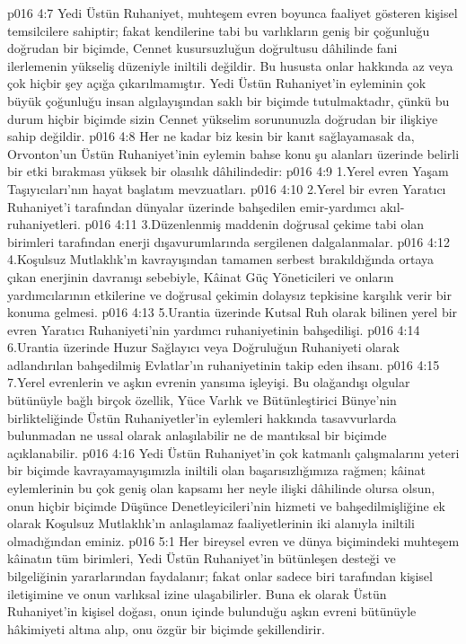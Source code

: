 \vs p016 4:7 Yedi Üstün Ruhaniyet, muhteşem evren boyunca faaliyet gösteren kişisel temsilcilere sahiptir; fakat kendilerine tabi bu varlıkların geniş bir çoğunluğu doğrudan bir biçimde, Cennet kusursuzluğun doğrultusu dâhilinde fani ilerlemenin yükseliş düzeniyle iniltili değildir. Bu hususta onlar hakkında az veya çok hiçbir şey açığa çıkarılmamıştır. Yedi Üstün Ruhaniyet’in eyleminin çok büyük çoğunluğu insan algılayışından saklı bir biçimde tutulmaktadır, çünkü bu durum hiçbir biçimde sizin Cennet yükselim sorununuzla doğrudan bir ilişkiye sahip değildir.
\vs p016 4:8 Her ne kadar biz kesin bir kanıt sağlayamasak da, Orvonton’un Üstün Ruhaniyet’inin eylemin bahse konu şu alanları üzerinde belirli bir etki bırakması yüksek bir olasılık dâhilindedir:
\vs p016 4:9 1.\bibnobreakspace Yerel evren Yaşam Taşıyıcıları’nın hayat başlatım mevzuatları.
\vs p016 4:10 2.\bibnobreakspace Yerel bir evren Yaratıcı Ruhaniyet’i tarafından dünyalar üzerinde bahşedilen emir\hyp{}yardımcı akıl\hyp{}ruhaniyetleri.
\vs p016 4:11 3.\bibnobreakspace Düzenlenmiş maddenin doğrusal çekime tabi olan birimleri tarafından enerji dışavurumlarında sergilenen dalgalanmalar.
\vs p016 4:12 4.\bibnobreakspace Koşulsuz Mutlaklık’ın kavrayışından tamamen serbest bırakıldığında ortaya çıkan enerjinin davranışı sebebiyle, Kâinat Güç Yöneticileri ve onların yardımcılarının etkilerine ve doğrusal çekimin dolaysız tepkisine karşılık verir bir konuma gelmesi.
\vs p016 4:13 5.\bibnobreakspace Urantia üzerinde Kutsal Ruh olarak bilinen yerel bir evren Yaratıcı Ruhaniyeti’nin yardımcı ruhaniyetinin bahşedilişi.
\vs p016 4:14 6.\bibnobreakspace Urantia üzerinde Huzur Sağlayıcı veya Doğruluğun Ruhaniyeti olarak adlandırılan bahşedilmiş Evlatlar’ın ruhaniyetinin takip eden ihsanı.
\vs p016 4:15 7.\bibnobreakspace Yerel evrenlerin ve aşkın evrenin yansıma işleyişi. Bu olağandışı olgular bütünüyle bağlı birçok özellik, Yüce Varlık ve Bütünleştirici Bünye’nin birlikteliğinde Üstün Ruhaniyetler’in eylemleri hakkında tasavvurlarda bulunmadan ne ussal olarak anlaşılabilir ne de mantıksal bir biçimde açıklanabilir.
\vs p016 4:16 Yedi Üstün Ruhaniyet’in çok katmanlı çalışmalarını yeteri bir biçimde kavrayamayışımızla iniltili olan başarısızlığımıza rağmen; kâinat eylemlerinin bu çok geniş olan kapsamı her neyle ilişki dâhilinde olursa olsun, onun hiçbir biçimde Düşünce Denetleyicileri’nin hizmeti ve bahşedilmişliğine ek olarak Koşulsuz Mutlaklık’ın anlaşılamaz faaliyetlerinin iki alanıyla iniltili olmadığından eminiz.
\vs p016 5:1 Her bireysel evren ve dünya biçimindeki muhteşem kâinatın tüm birimleri, Yedi Üstün Ruhaniyet’in bütünleşen desteği ve bilgeliğinin yararlarından faydalanır; fakat onlar sadece biri tarafından kişisel iletişimine ve onun varlıksal izine ulaşabilirler. Buna ek olarak Üstün Ruhaniyet’in kişisel doğası, onun içinde bulunduğu aşkın evreni bütünüyle hâkimiyeti altına alıp, onu özgür bir biçimde şekillendirir.
